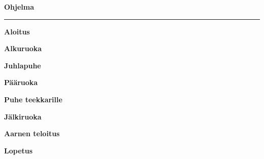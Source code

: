 \centering

\textbf{\Large Ohjelma}

\rule{5cm}{0.5mm}
\vspace{6mm}

\textbf{\large Aloitus} \vspace{5mm}

\textbf{\large Alkuruoka} \vspace{5mm}

\textbf{\large Juhlapuhe} \vspace{5mm}

\textbf{\large Pääruoka} \vspace{5mm}

\textbf{\large Puhe teekkarille} \vspace{5mm}

\textbf{\large Jälkiruoka} \vspace{5mm}

\textbf{\large Aarnen teloitus} \vspace{5mm}

\textbf{\large Lopetus}

\RaggedRight